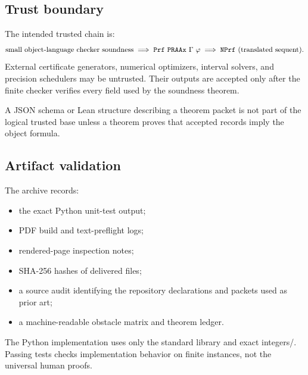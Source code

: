 \subsection{Trust boundary}

The intended trusted chain is:
\[
 \text{small object-language checker soundness}
 \;\Longrightarrow\;
 \texttt{Prf}\ \texttt{PRAAx}\ \Gamma\ \varphi
 \;\Longrightarrow\;
 \texttt{NPrf}\ (\text{translated sequent}).
\]
External certificate generators, numerical optimizers, interval solvers, and precision schedulers may be untrusted.  Their outputs are accepted only after the finite checker verifies every field used by the soundness theorem.

A JSON schema or Lean structure describing a theorem packet is not part of the logical trusted base unless a theorem proves that accepted records imply the object formula.

\subsection{Artifact validation}

The archive records:
\begin{itemize}
\item the exact Python unit-test output;
\item PDF build and text-preflight logs;
\item rendered-page inspection notes;
\item SHA-256 hashes of delivered files;
\item a source audit identifying the repository declarations and packets used as prior art;
\item a machine-readable obstacle matrix and theorem ledger.
\end{itemize}
The Python implementation uses only the standard library and exact integers/.  Passing tests checks implementation behavior on finite instances, not the universal human proofs.
